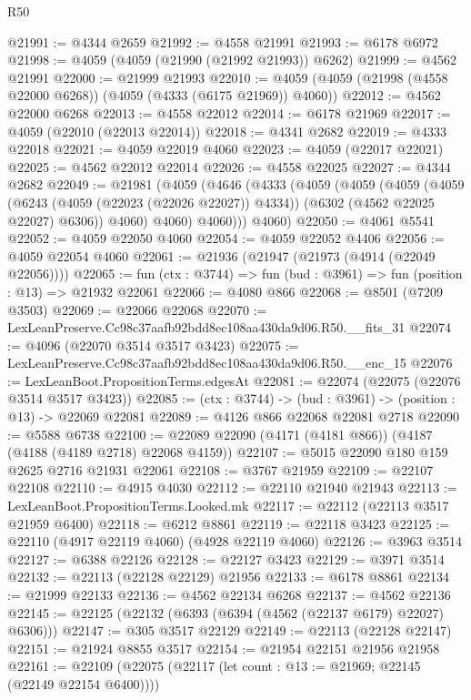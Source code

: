 \begin{lexlean}{R50}
\begin{coremodule}
@21991 := @4344 @2659
@21992 := @4558 @21991
@21993 := @6178 @6972
@21998 := @4059 (@4059 (@21990 (@21992 @21993)) @6262)
@21999 := @4562 @21991
@22000 := @21999 @21993
@22010 := @4059 (@4059 (@21998 (@4558 @22000 @6268)) (@4059 (@4333 (@6175 @21969)) @4060))
@22012 := @4562 @22000 @6268
@22013 := @4558 @22012
@22014 := @6178 @21969
@22017 := @4059 (@22010 (@22013 @22014))
@22018 := @4341 @2682
@22019 := @4333 @22018
@22021 := @4059 @22019 @4060
@22023 := @4059 (@22017 @22021)
@22025 := @4562 @22012 @22014
@22026 := @4558 @22025
@22027 := @4344 @2682
@22049 := @21981
    (@4059
      (@4646
        (@4333
          (@4059
            (@4059
              (@4059
                (@4059
                  (@6243 (@4059 (@22023 (@22026 @22027)) @4334))
                  (@6302 (@4562 @22025 @22027) @6306))
                @4060)
              @4060)
            @4060)))
      @4060)
@22050 := @4061 @5541
@22052 := @4059 @22050 @4060
@22054 := @4059 @22052 @4406
@22056 := @4059 @22054 @4060
@22061 := @21936 (@21947 (@21973 (@4914 (@22049 @22056))))
@22065 := fun (ctx : @3744) => fun (bud : @3961) => fun (position : @13) => @21932 @22061
@22066 := @4080 @866
@22068 := @8501 (@7209 @3503)
@22069 := @22066 @22068
@22070 := LexLeanPreserve.Cc98c37aafb92bdd8ec108aa430da9d06.R50.__fits_31
@22074 := @4096 (@22070 @3514 @3517 @3423)
@22075 := LexLeanPreserve.Cc98c37aafb92bdd8ec108aa430da9d06.R50.__enc_15
@22076 := LexLeanBoot.PropositionTerms.edgesAt
@22081 := @22074 (@22075 (@22076 @3514 @3517 @3423))
@22085 := (ctx : @3744) -> (bud : @3961) -> (position : @13) -> @22069 @22081
@22089 := @4126 @866 @22068 @22081 @2718
@22090 := @5588 @6738
@22100 := @22089 @22090 (@4171 (@4181 @866)) (@4187 (@4188 (@4189 @2718) @22068 @4159))
@22107 := @5015 @22090 @180 @159 @2625 @2716 @21931 @22061
@22108 := @3767 @21959
@22109 := @22107 @22108
@22110 := @4915 @4030
@22112 := @22110 @21940 @21943
@22113 := LexLeanBoot.PropositionTerms.Looked.mk
@22117 := @22112 (@22113 @3517 @21959 @6400)
@22118 := @6212 @8861
@22119 := @22118 @3423
@22125 := @22110 (@4917 @22119 @4060) (@4928 @22119 @4060)
@22126 := @3963 @3514
@22127 := @6388 @22126
@22128 := @22127 @3423
@22129 := @3971 @3514
@22132 := @22113 (@22128 @22129) @21956
@22133 := @6178 @8861
@22134 := @21999 @22133
@22136 := @4562 @22134 @6268
@22137 := @4562 @22136
@22145 := @22125 (@22132 (@6393 (@6394 (@4562 (@22137 @6179) @22027) @6306)))
@22147 := @305 @3517 @22129
@22149 := @22113 (@22128 @22147)
@22151 := @21924 @8855 @3517
@22154 := @21954 @22151 @21956 @21958
@22161 := @22109 (@22075 (@22117 (let count : @13 := @21969; @22145 (@22149 @22154 @6400))))

\end{coremodule}
\end{lexlean}
